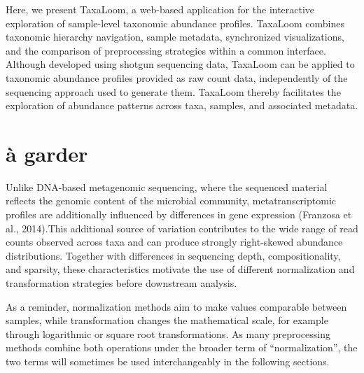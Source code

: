 Here, we present TaxaLoom, a web-based application for the interactive exploration of sample-level taxonomic abundance profiles. TaxaLoom combines taxonomic hierarchy navigation, sample metadata, synchronized visualizations, and the comparison of preprocessing strategies within a common interface. Although developed using shotgun sequencing data, TaxaLoom can be applied to taxonomic abundance profiles provided as raw count data, independently of the sequencing approach used to generate them. TaxaLoom thereby facilitates the exploration of abundance patterns across taxa, samples, and associated metadata.


\section{à garder}

Unlike DNA-based metagenomic sequencing, where the sequenced material reflects the genomic content of the microbial community, metatranscriptomic profiles are additionally influenced by differences in gene expression (Franzosa et al., 2014).This additional source of variation contributes to the wide range of read counts observed across taxa and can produce strongly right-skewed abundance distributions. Together with differences in sequencing depth, compositionality, and sparsity, these characteristics motivate the use of different normalization and transformation strategies before downstream analysis.


As a reminder, normalization methods aim to make values comparable between samples, while transformation changes the mathematical scale, for example through logarithmic or square root transformations. As many preprocessing methods combine both operations under the broader term of ``normalization'', the two terms will sometimes be used interchangeably in the following sections.


